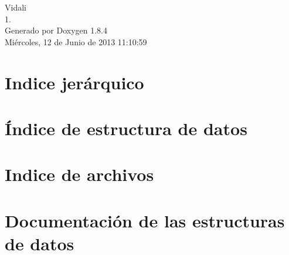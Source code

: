 \documentclass[twoside]{book}
\newcommand{\clearemptydoublepage}{%
  \newpage{\pagestyle{empty}\cleardoublepage}%
}
\begin{document}
\hypersetup{pageanchor=false}
\begin{titlepage}
\vspace*{7cm}
\begin{center}%
{\Large Vidali \\[1ex]\large 1. }\\
\vspace*{1cm}
{\large Generado por Doxygen 1.8.4}\\
\vspace*{0.5cm}
{\small Miércoles, 12 de Junio de 2013 11:10:59}\\
\end{center}
\end{titlepage}
\clearemptydoublepage
\tableofcontents
\clearemptydoublepage
{}
\hypersetup{pageanchor=true}

\chapter{Indice jerárquico}

\chapter{Índice de estructura de datos}

\chapter{Indice de archivos}

\chapter{Documentación de las estructuras de datos}




































\end{document}
